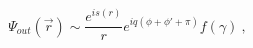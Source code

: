 \begin{equation}
\Psi_{out}(\vec{r})\sim \frac{e^{is(r)}}re^{iq(\phi+\phi'+\pi)}f(\gamma) \ ,
\end{equation}

